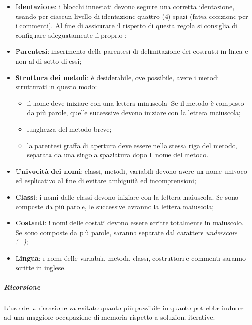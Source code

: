				\begin{itemize}
					\item \textbf{Identazione}: i blocchi innestati devono seguire una corretta identazione, usando per ciascun livello di identazione quattro (4) spazi (fatta eccezione per i commenti). Al fine di assicurare il rispetto di questa regola si consiglia di configuare adeguatamente il proprio ;
					\item \textbf{Parentesi}: inserimento delle parentesi di delimitazione dei costrutti in linea e non al di sotto di essi; 
					\item \textbf{Struttura dei metodi}: è desiderabile, ove possibile, avere i metodi strutturati in questo modo:
					\begin{itemize}
						\item il nome deve iniziare con una lettera minuscola. Se il metodo è composto da più parole, quelle successive devono iniziare con la lettera maiuscola;
						\item lunghezza del metodo breve;
						\item la parentesi graffa di apertura deve essere nella stessa riga del metodo, separata da una singola spaziatura dopo il nome del metodo.
					\end{itemize}
					\item \textbf{Univocità dei nomi}: classi, metodi, variabili devono avere un nome univoco ed esplicativo al fine di evitare ambiguità ed incomprensioni;
					\item \textbf{Classi}: i nomi delle classi devono iniziare con la lettera maiuscola. Se sono composte da più parole, le successive avranno la lettera maiuscola;
					\item \textbf{Costanti}: i nomi delle costati devono essere scritte totalmente in maiuscolo. Se sono composte da più parole, saranno separate dal carattere \textit{underscore (\_)};
					\item \textbf{Lingua}: i nomi delle variabili, metodi, classi, costruttori e commenti saranno scritte in inglese.
				\end{itemize}
				\subparagraph{Ricorsione}
				L'uso della ricorsione va evitato quanto più possibile in quanto potrebbe indurre ad una maggiore occupazione di memoria rispetto a soluzioni iterative.
		 		
